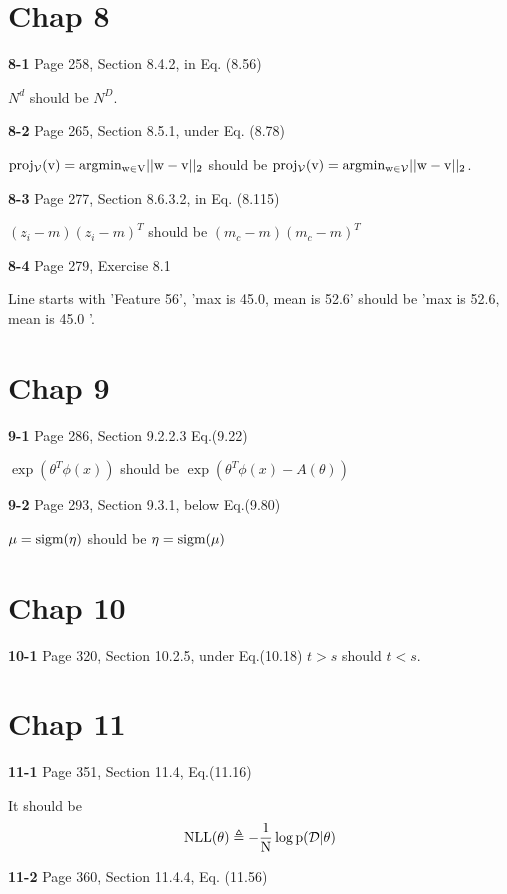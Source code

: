 \documentclass[aps,preprint,a4]{revtex4-1}
\newcommand{\nl}{\nonumber \\}
\begin{document}
\section{Chap 8}
{\color{red}\textbf{8-1}} Page 258, Section 8.4.2, in Eq. (8.56)

$N^{d}$ should be $N^{D}$.

{\color{red}\textbf{8-2}} Page 265, Section 8.5.1, under Eq. (8.78)

$\rm proj_{\mathcal V}(v)=\rm argmin_{w\in V}||\rm w-\rm v||_{2}$ should be 
$\rm proj_{\mathcal V}(v)=\rm argmin_{w\in \mathcal V}||w-v||_{2}$.

{\color{red}\textbf{8-3}} Page 277, Section 8.6.3.2, in Eq. (8.115)

$(z_{i}-m)(z_{i}-m)^{T}$ should be $(m_{c}-m)(m_{c}-m)^{T}$

{\color{red}\textbf{8-4}} Page 279, Exercise 8.1 

Line starts with 'Feature 56', 'max is 45.0, mean is 52.6' should be
'max is 52.6, mean is 45.0 '.



\section{Chap 9}
{\color{red}\textbf{9-1}} Page 286, Section 9.2.2.3 Eq.(9.22)

$\exp{(\theta^{T}\phi(x))}$ should be $\exp{(\theta^{T}\phi(x)-A(\theta))}$

{\color{red}\textbf{9-2}} Page 293, Section 9.3.1, below Eq.(9.80)

$\mu = \rm sigm(\eta)$ should be $\eta = \rm sigm(\mu)$


\section{Chap 10}
{\color{red}\textbf{10-1}} Page 320, Section 10.2.5, under Eq.(10.18)
$t>s$ should $t<s$.

\section{Chap 11}
{\color{red}\textbf{11-1}} Page 351, Section 11.4, Eq.(11.16)

It should be
\begin{equation}
\rm NLL(\theta) \triangleq -\frac{1}{N} \log p(\mathcal D|\theta)\nl
\end{equation}

{\color{red}\textbf{11-2}} Page 360, Section 11.4.4, Eq. (11.56)
\end{document}
